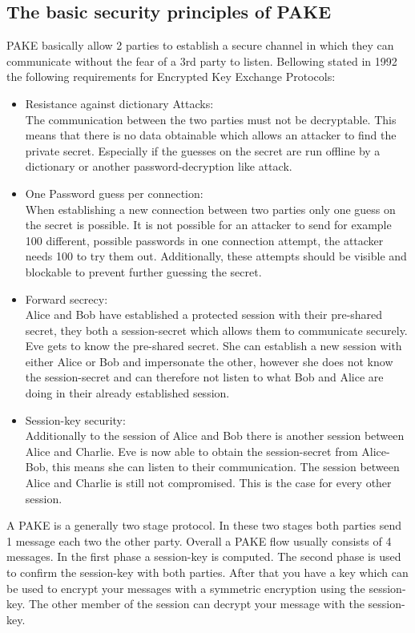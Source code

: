 \documentclass[journal]{IEEEtran}
\begin{document}
\subsection{The basic security principles of PAKE}
PAKE basically allow 2 parties to establish a secure channel in which they can communicate without the fear of a 3rd party to listen.
Bellowing stated in 1992 the following requirements for Encrypted Key Exchange Protocols: \cite{bellovin1992encrypted}
\begin{itemize}[]
    \item Resistance against dictionary Attacks: \\
        The communication between the two parties must not be decryptable. This means that there is no data obtainable which allows an attacker to find the private secret. 
        Especially if the guesses on the secret are run offline by a dictionary or another password-decryption like attack.
    \item One Password guess per connection: \\
        When establishing a new connection between two parties only one guess on the secret is possible. It is not possible for an attacker to send for example 100 different, possible passwords in one connection attempt, the attacker needs 100 to try them out.
        Additionally, these attempts should be visible and blockable to prevent further guessing the secret. 
    \item Forward secrecy: \\
        Alice and Bob have established a protected session with their pre-shared secret, they both a session-secret which allows them to communicate securely. Eve gets to know the pre-shared secret. 
        She can establish a new session with either Alice or Bob and impersonate the other, however she does not know the session-secret and can therefore not listen to what Bob and Alice are doing in their already established session.
    \item Session-key security: \\
        Additionally to the session of Alice and Bob there is another session between Alice and Charlie. Eve is now able to obtain the session-secret from Alice-Bob, this means she can listen to their communication. 
        The session between Alice and Charlie is still not compromised. This is the case for every other session.
\end{itemize}
A PAKE is a generally two stage protocol. \cite{hao2022sok} In these two stages both parties send 1 message each two the other party. 
Overall a PAKE flow usually consists of 4 messages.
In the first phase a session-key is computed.
The second phase is used to confirm the session-key with both parties.
After that you have a key which can be used to encrypt your messages with a symmetric encryption using the session-key. 
The other member of the session can decrypt your message with the session-key. 
\end{document}
